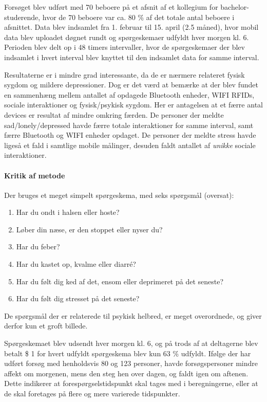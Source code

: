Forsøget blev udført med 70 beboere på et afsnit af et kollegium for bachelor-studerende, hvor de 70 beboere var ca. 80 \% af det totale antal beboere i afsnittet.
Data blev indsamlet fra 1. februar til 15. april (2.5 måned), hvor mobil data blev uploadet døgnet rundt og spørgeskemaer udfyldt hver morgen kl. 6.
Perioden blev delt op i 48 timers intervaller, hvor de spørgeskemaer der blev indsamlet i hvert interval blev knyttet til den indsamlet data for samme interval.

Resultaterne er i mindre grad interessante, da de er nærmere relateret fysisk sygdom og mildere depressioner.
Dog er det værd at bemærke at der blev fundet en sammenhæng mellem antallet af opdagede Bluetooth enheder, WIFI RFIDs, sociale interaktioner og fysisk/psykisk sygdom.
Her er antagelsen at et færre antal devices er resultat af mindre omkring færden.
De personer der meldte sad/lonely/depressed havde færre totale interaktioner for samme interval, samt færre Bluetooth og WIFI enheder opdaget.
De personer der meldte stress havde ligeså et fald i samtlige mobile målinger, desuden faldt antallet af \textit{unikke} sociale interaktioner.

\paragraph{Kritik af metode}
Der bruges et meget simpelt spørgeskema, med seks spørgsmål (oversat):
\begin{enumerate}
\item Har du ondt i halsen eller hoste?
\item Løber din næse, er den stoppet eller nyser du?
\item Har du feber?
\item Har du kastet op, kvalme eller diarré?
\item Har du følt dig ked af det, ensom eller deprimeret på det seneste?
\item Har du følt dig stresset på det seneste?
\end{enumerate}

De spørgsmål der er relaterede til psykisk helbred, er meget overordnede, og giver derfor kun et groft billede.

Spørgeskemaet blev udsendt hver morgen kl. 6, og på trods af at deltagerne blev betalt \$ 1 for hvert udfyldt spørgeskema blev kun 63 \% udfyldt.
Ifølge \citet{panas} der har udført forsøg med henholdsvis 80 og 123 personer, havde forsøgspersoner mindre affekt om morgenen, mens den steg hen over dagen, og faldt igen om aftenen.
Dette indikerer at forespørgselstidspunkt skal tages med i beregningerne, eller at de skal foretages på flere og mere varierede tidspunkter.

